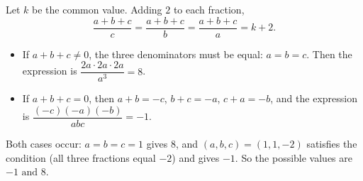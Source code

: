Let $k$ be the common value. Adding $2$ to each fraction,
\[
\dfrac{a+b+c}{c}=\dfrac{a+b+c}{b}=\dfrac{a+b+c}{a}=k+2 .
\]
\begin{itemize}
\item If $a+b+c\ne0$, the three denominators must be equal: $a=b=c$. Then the expression is $\dfrac{2a\cdot2a\cdot2a}{a^3}=8$.
\item If $a+b+c=0$, then $a+b=-c$, $b+c=-a$, $c+a=-b$, and the expression is $\dfrac{(-c)(-a)(-b)}{abc}=-1$.
\end{itemize}
Both cases occur: $a=b=c=1$ gives $8$, and $(a,b,c)=(1,1,-2)$ satisfies the condition (all three fractions equal $-2$) and gives $-1$. So the possible values are $\boxed{-1\text{ and }8}$.
